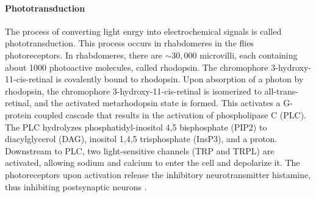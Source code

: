 \paragraph{Phototransduction}
The process of converting light enrgy into electrochemical signals is called phototransduction. This process occurs in rhabdomeres in the flies photoreceptors. In rhabdomeres, there are ${\sim}30,000$ microvilli, each containing about 1000 photoactive molecules, called rhodopsin. The chromophore 3-hydroxy-11-cis-retinal is covalently bound to rhodopsin. Upon absorption of a photon by rhodopsin, the chromophore 3-hydroxy-11-cis-retinal is isomerized to all-trans-retinal, and the activated metarhodopsin state is formed. This activates a G-protein coupled cascade that results in the activation of phospholipase C (PLC). The PLC hydrolyzes phosphatidyl-inositol 4,5 bisphosphate (PIP2) to diacylglycerol (DAG), inositol 1,4,5 trisphosphate (InsP3), and a proton.  Downstream to PLC, two light-sensitive channels (TRP and TRPL) are activated, allowing sodium and calcium to enter the cell and depolarize it. The photoreceptors upon activation release the inhibitory neurotransmitter histamine, thus inhibiting postsynaptic neurons \parencite{Hardie2001, Hardie1989, Hardie2015}.


